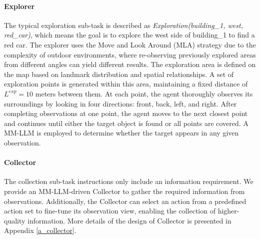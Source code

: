 \paragraph{Explorer}
The typical exploration sub-task is described as \textit{Exploration(building\_1, west, red\_car)}, which means the goal is to explore the west side of building\_1 to find a red car. The explorer uses the Move and Look Around (MLA) strategy due to the complexity of outdoor environments, where re-observing previously explored areas from different angles can yield different results. The exploration area is defined on the map based on landmark distribution and spatial relationships. A set of exploration points is generated within this area, maintaining a fixed distance of ${L^{exp}=10}$ meters between them. At each point, the agent thoroughly observes its surroundings by looking in four directions: front, back, left, and right. After completing observations at one point, the agent moves to the next closest point and continues until either the target object is found or all points are covered. A MM-LLM is employed to determine whether the target appears in any given observation.

\paragraph{Collector}
The collection sub-task instructions only include an information requirement. We provide an MM-LLM-driven Collector to gather the required information from observations. Additionally, the Collector can select an action from a predefined action set to fine-tune its observation view, enabling the collection of higher-quality information. More details of the design of Collector is presented in Appendix \ref{a_collector}.